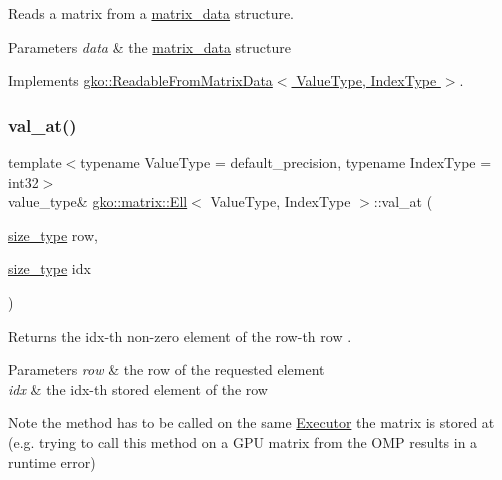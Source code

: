 Reads a matrix from a \hyperlink{structgko_1_1matrix__data}{matrix\+\_\+data} structure. 


\begin{DoxyParams}{Parameters}
{\em data} & the \hyperlink{structgko_1_1matrix__data}{matrix\+\_\+data} structure \\
\hline
\end{DoxyParams}


Implements \hyperlink{classgko_1_1ReadableFromMatrixData_add5c12e23b3ac3c8fbd607fa5a9656bb}{gko\+::\+Readable\+From\+Matrix\+Data$<$ Value\+Type, Index\+Type $>$}.

\mbox{\label{classgko_1_1matrix_1_1Ell_a0d2365837e44dc1889fc16000ff3b0a9}} 
\subsubsection{\texorpdfstring{val\+\_\+at()}{val\_at()}\hspace{0.1cm}{\footnotesize\ttfamily [1/2]}}
{\footnotesize\ttfamily template$<$typename Value\+Type = default\+\_\+precision, typename Index\+Type = int32$>$ \\
value\+\_\+type\& \hyperlink{classgko_1_1matrix_1_1Ell}{gko\+::matrix\+::\+Ell}$<$ Value\+Type, Index\+Type $>$\+::val\+\_\+at (\begin{DoxyParamCaption}\item[{\hyperlink{namespacegko_a6e5c95df0ae4e47aab2f604a22d98ee7}{size\+\_\+type}}]{row,  }\item[{\hyperlink{namespacegko_a6e5c95df0ae4e47aab2f604a22d98ee7}{size\+\_\+type}}]{idx }\end{DoxyParamCaption})\hspace{0.3cm}{\ttfamily [noexcept]}}



Returns the {\ttfamily idx}-\/th non-\/zero element of the {\ttfamily row}-\/th row . 


\begin{DoxyParams}{Parameters}
{\em row} & the row of the requested element \\
\hline
{\em idx} & the idx-\/th stored element of the row\\
\hline
\end{DoxyParams}
\begin{DoxyNote}{Note}
the method has to be called on the same \hyperlink{classgko_1_1Executor}{Executor} the matrix is stored at (e.\+g. trying to call this method on a G\+PU matrix from the O\+MP results in a runtime error) 
\end{DoxyNote}



